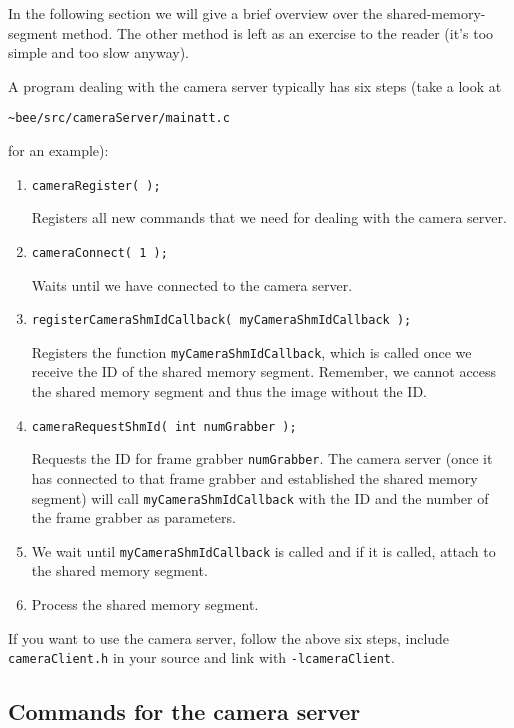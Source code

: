 \documentclass{article}
\begin{document}
In the following section we will give a brief overview over the
shared-memory-segment method. The other method is left as an exercise to the
reader (it's too simple and too slow anyway).
 
A program dealing with the camera server typically has six steps (take a look at
\begin{center} 
  \texttt{\~{}bee/src/cameraServer/mainatt.c}
\end{center}
for an example):

\begin{enumerate}
  
\item \texttt{cameraRegister( );} 
  
  Registers all new commands that we need for dealing with the camera server.
  
\item \texttt{cameraConnect( 1 );} 
  
  Waits until we have connected to the camera server.
  
\item \texttt{registerCameraShmIdCallback( myCameraShmIdCallback );} 
  
  Registers the function \texttt{myCameraShmIdCallback}, which is called once
  we receive the ID of the shared memory segment. Remember, we cannot access
  the shared memory segment and thus the image without the ID.
  
\item \texttt{cameraRequestShmId( int numGrabber );} 
  
  Requests the ID for frame grabber \texttt{numGrabber}. The camera server
  (once it has connected to that frame grabber and established the shared
  memory segment) will call \texttt{myCameraShmIdCallback} with the ID and the
  number of the frame grabber as parameters.
  
\item We wait until \texttt{myCameraShmIdCallback} is called and if it is
  called, attach to the shared memory segment.

\item Process the shared memory segment.

\end{enumerate}
 
If you want to use the camera server, follow the above six steps, include
\texttt{cameraClient.h} in your source and link with \texttt{-lcameraClient}.

\subsection{Commands for the camera server}
\end{document}
